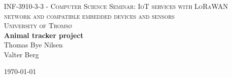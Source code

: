 \renewcommand{\partfont}{\normalfont\Huge\bfseries}
\renewcommand{\chapterfont}{\normalfont\huge\bfseries}
\renewcommand{\sectionfont}{\normalfont\LARGE\bfseries}





\begin{titlepage} %
	\newcommand{\HRule}{\rule{\linewidth}{0.5mm}} %
	
	\center %
	
	
	\textsc{\LARGE INF-3910-3-3 - Computer Science Seminar: IoT services with LoRaWAN network and compatible embedded devices and sensors}\\[1.5cm] %
	
	\textsc{\Large University of Tromsø}\\[0.5cm] %
	
	
	
	
	
	{\huge\bfseries Animal tracker project }\\[0.4cm] %

	
	{\Large{Thomas Bye Nilsen\\Valter Berg}}
	
	\vfill\vfill\vfill %
	
	{\large\today} %
		
	\vfill %
	
\end{titlepage}


